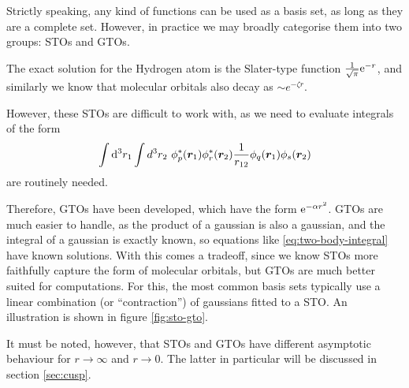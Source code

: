 Strictly speaking, any kind of functions can be used as a basis set, as long as they are a complete set. However, in practice we may broadly categorise them into two groups: \glspl{STO} and \glspl{GTO}.

The exact solution for the Hydrogen atom is the Slater-type function $\frac 1{\sqrt{\pi}} \mathrm{e}^{-r}$, and similarly we know that molecular orbitals also decay as $\sim e^{-\zeta r}$.

However, these \glspl{STO} are difficult to work with, as we need to evaluate integrals of the form
\begin{equation}
    \label{eq:two-body-integral}
\int\mathrm{d}^3r_1\int d^3r_2\ \phi_p^*(\bm r_1)\phi_r^*(\bm r_2)\frac 1 {r_{12}}\phi_q(\bm r_1)\phi_s(\bm r_2)
\end{equation}
are routinely needed.

Therefore, \glspl{GTO} have been developed,\cite{boysElectronic1950} which have the form $\mathrm{e}^{-\alpha r^2}$. \glspl{GTO} are much easier to handle, as the product of a gaussian is also a gaussian, and the integral of a gaussian is exactly known, so equations like \eqref{eq:two-body-integral} have known solutions. With this comes a tradeoff, since we know \glspl{STO} more faithfully capture the form of molecular orbitals, but \glspl{GTO} are much better suited for computations. For this, the most common basis sets typically use a linear combination (or ``contraction'') of gaussians fitted to a \gls{STO}. An illustration is shown in figure \ref{fig:sto-gto}.

It must be noted, however, that \glspl{STO} and \glspl{GTO} have different asymptotic behaviour for $r\to\infty$ and $r\to 0$. The latter in particular will be discussed in section \ref{sec:cusp}.

